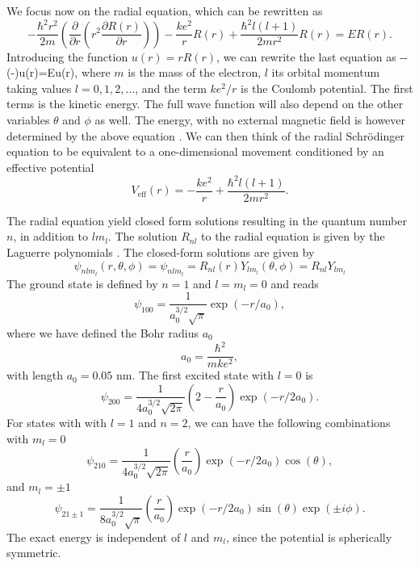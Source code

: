 We focus now on the radial equation, which can be rewritten as 
\[
-\frac{\hbar^2 r^2}{2m}\left(\frac{\partial }{\partial r}
          (r^2\frac{\partial R(r)}{\partial r})\right) 
-\frac{ke^2}{r}R(r)+\frac{\hbar^2l(l+1)}{2mr^2}R(r)=ER(r).
\]
Introducing the function $u(r)=rR(r)$, we can rewrite the last equation as
\be
--
\left(-\right)u(r)=Eu(r),
\label{eq:radialsl}
\ee
where $m$ is the mass of the electron, $l$ its orbital momentum
taking values $l=0,1,2,\dots$, and the term
$ke^2/r$ is the Coulomb potential. The first terms is the 
kinetic energy. The full wave function
will also depend on the other variables $\theta$ and $\phi$ as well.
The energy, with no external magnetic field is however determined by the 
above equation . We can then think of the  
radial Schr\"odinger equation to be equivalent to a one-dimensional
movement conditioned by an effective potential
\[
V_{\mathrm{eff}}(r)=-\frac{ke^2}{r}+\frac{\hbar^2l(l+1)}{2mr^2}.
\]

The radial equation yield closed form solutions resulting in the quantum number
$n$, in addition to $lm_l$. The solution 
$R_{nl}$ to the radial equation is given by the Laguerre polynomials \cite{liboff}. 
The closed-form solutions are given by 
\[
\psi_{nlm_l}(r,\theta,\phi)=\psi_{nlm_l}=R_{nl}(r)Y_{lm_l}(\theta,\phi)=
         R_{nl}Y_{lm_l}
\]
The ground state is defined by 
$n=1$ and $l=m_l=0$ and reads
\[
   \psi_{100}=\frac{1}{a_0^{3/2}\sqrt{\pi}}\exp{(-r/a_0)},
\]
where we have defined the Bohr radius $a_0$
\[
  a_0 = \frac{\hbar^2}{mke^2},
\]
with length $a_0=0.05$ nm.
The first excited state with  $l=0$ is
\[
   \psi_{200}=\frac{1}{4a_0^{3/2}\sqrt{2\pi}}
   \left(2-\frac{r}{a_0}\right)\exp{(-r/2a_0)}.
\]
For states with  with $l=1$ and $n=2$, we can have the following combinations with $m_l=0$
\[
   \psi_{210}=\frac{1}{4a_0^{3/2}\sqrt{2\pi}}
   \left(\frac{r}{a_0}\right)\exp{(-r/2a_0)}\cos{(\theta)}, 
\]
and $m_l=\pm 1$
\[
   \psi_{21\pm 1}=\frac{1}{8a_0^{3/2}\sqrt{\pi}}
   \left(\frac{r}{a_0}\right)\exp{(-r/2a_0)}\sin{(\theta)}\exp{(\pm i\phi)}.
\]
The exact energy is independent of $l$ and $m_l$, since the potential is spherically symmetric.

